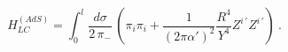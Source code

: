 \begin{equation}\label{eq:LC AdS Hamiltonian}
   H_{LC}^{(AdS)}= \int_0^l \frac{d\sigma}{2\, \pi_-} \, \left(
                     \pi_i \pi_i +
                     \frac{1}{(2\pi\alpha')^2}
                     \frac{R^4}{Y^4} Z^{i\,\prime} Z^{i\,\prime}
                     \right)\ .
\end{equation}

